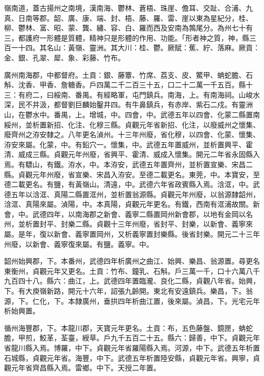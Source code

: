 
\begin{pinyinscope}

 嶺南道，蓋古揚州之南境，漢南海、鬱林、蒼梧、珠崖、儋耳、交趾、合浦、九真、日南等郡。韶、廣、康、端、封、梧、藤、羅、雷、崖以東為星紀分，桂、柳、鬱林、富、昭、蒙、龔、繡、容、白、羅而西及安南為鶉尾分。為州七十有三，都護府一形體是質體，精神只是形體的作用、功能。「形者神之質，神，縣三百一十四。其名山：黃嶺、靈洲。其大川：桂、鬱。厥賦：蕉、紵、落麻。厥貢：金、銀、孔翠、犀、象、彩藤、竹布。



 廣州南海郡，中都督府。土貢：銀、藤簟、竹席、荔支、皮、鱉甲、蚺蛇膽、石斛、沈香、甲香、詹糖香。戶四萬二千二百三十五，口二十二萬一千五百。縣十三：有府二，曰綏南、番禺。有經略軍，屯門鎮兵。南海，上。有南海祠。山峻水深，民不井汲，都督劉巨麟始鑿井四。有牛鼻鎮兵，有赤岸、紫石二戍。有靈洲山，在鬱水中。番禺，上。增城，中。四會，中。武德五年以四會、化蒙二縣置南綏州，並析置新招、化注、化穆三縣。貞觀元年省新招、化注，以廢威州之懷集、廢齊州之洊安隸之。八年更名湞州。十三年州廢，省化穆，以四會、化蒙、懷集、洊安來屬。化蒙，中。有鉛穴一。懷集，中。武德五年置威州，並析置興平、霍清、威成三縣。貞觀元年州廢，省興平、霍清、威成入懷集。開元二年省永固縣入焉。有驃山，有鐵。洊水，中。本洊安，武德五年置齊州，並析置宣樂、宋昌二縣。貞觀元年州廢，省宣樂、宋昌入洊安。至德二載更名。東莞，中。本寶安，至德二載更名。有鹽，有黃嶺山。清遠，中。武德六年省政賓縣入焉。浛洭，中。武德五年以浛洭、真陽二縣置洭州，並析置翁源縣。貞觀元年州廢，以翁源隸韶州，浛洭、真陽來屬。湞陽，中。本真陽，貞觀元年更名。有鐵，西南有洭浦故關。新會，中。武德四年，以南海郡之新會、義寧二縣置岡州新會郡，以地有金岡以名州，並析置封平、封樂二縣。貞觀十三年州廢，省封平、封樂，以新會、義寧來屬。是年，復以新會、義寧置岡州，又析義寧置封樂縣。後省封樂。開元二十三年州廢，以新會、義寧復來屬。有鹽。義寧。中。



 韶州始興郡，下。本番州，武德四年析廣州之曲江、始興、樂昌、翁源置。尋更名東衡州，貞觀元年又更名。土貢：竹布、鐘乳、石斛。戶三萬一千，口十六萬八千九百四十八。縣六：曲江，上。武德四年置臨瀧、良化二縣，貞觀八年省。始興，下。有大庾嶺新路，開元十六年，詔張九齡開。東北有安遠鎮兵。樂昌，下。翁源，下。仁化，下。本隸廣州，垂拱四年析曲江置，後來屬。湞昌，下。光宅元年析始興置。



 循州海豐郡，下。本龍川郡，天寶元年更名。土貢：布，五色藤盤、鏡匣，蚺蛇膽，甲煎，鮫革，荃臺，綬草。戶九千五百二十五。縣六：歸善，中下。貞觀元年省龍川縣入焉。博羅，中下。貞觀元年省羅陽縣入焉。河源，中下。武德五年析置石城縣，貞觀元年省。海豐，中下。武德五年析置陸安縣，貞觀元年省。興寧，貞觀元年省齊昌縣入焉。雷鄉。中下。天授二年置。




\end{pinyinscope}
